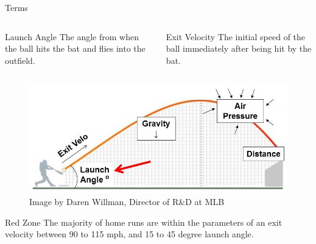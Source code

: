 \documentclass[14pt]{bredelebeamer}
\begin{document}
\begin{frame}{Terms}
  \begin{columns}
   \begin{column}{0.5\textwidth}
      \begin{block}{Launch Angle}
      The angle from when the ball hits the bat and flies 		into the outfield.
      \end{block}
    \end{column}
  \begin{column}{0.5\textwidth}
  \begin{block}{Exit Velocity} 
  The initial speed of the ball immediately after being hit 	by the bat.
  \end{block}
  \end{column}
  \end{columns}
  

\begin{figure}[]
\centering
\includegraphics[scale = 0.27]{images/LaunchAExitV-DarenWillman}
\caption{Image by Daren Willman, Director of R\&D at MLB}
\label{figure:DKinflation}
\end{figure}


  \begin{alertblock}{Red Zone}
  The majority of home runs are within the parameters of an 	exit velocity between 90 to 115 mph, and 15 to 45 		degree launch angle.
  \end{alertblock}
\end{frame}
\end{document}
